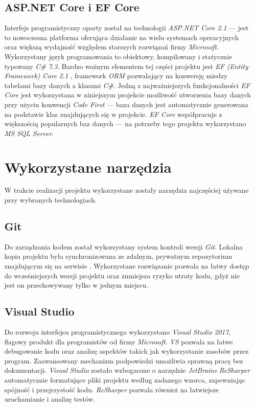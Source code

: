 \documentclass[eng,printmode,openany]{mgr}
\begin{document}
	\subsection{ASP.NET Core i EF Core}
	Interfejs programistyczny oparty został na technologii \textit{ASP.NET Core 2.1} — jest to nowoczesna platforma oferująca działanie na wielu systemach operacyjnych oraz większą wydajność względem starszych rozwiązań firmy \textit{Microsoft}. Wykorzystany język programowania to obiektowy, kompilowany i statycznie typowany \textit{C\# 7.3}. Bardzo ważnym elementem tej części projektu jest \textit{EF (Entity Framework) Core 2.1} \cite{msdn-efcore}, framework \textit{ORM}  pozwalający na konwersję miedzy tabelami bazy danych a klasami \textit{C\#}. Jedną z najważniejszych funkcjonalności \textit{EF Core} jest wykorzystana w niniejszym projekcie możliwość utworzenia bazy danych przy użyciu konwencji \textit{Code First} — baza danych jest automatycznie generowana na podstawie klas  znajdujących się w projekcie. \textit{EF Core} współpracuje z większością popularnych baz danych — na potrzeby tego projektu wykorzystano \textit{MS SQL Server}.
	
	\section{Wykorzystane narzędzia}
	W trakcie realizacji projektu wykorzystane zostały narzędzia najczęściej używane przy wybranych technologiach.
	\subsection{Git}
	Do zarządzania kodem został wykorzystany system kontroli wersji \textit{Git}. Lokalna kopia projektu była synchronizowana ze zdalnym, prywatnym repozytorium znajdującym się na serwisie . Wykorzystane rozwiązanie pozwala na łatwy dostęp do wcześniejszych wersji projektu oraz zmniejsza ryzyko utraty kodu, gdyż nie jest on przechowywany tylko w jednym miejscu.
	\subsection{Visual Studio}
	Do rozwoju interfejsu programistycznego wykorzystano \textit{Visual Studio 2017}, flagowy produkt dla programistów od firmy \textit{Microsoft}. \textit{VS} pozwala na łatwe debugowanie kodu oraz analizę aspektów takich jak wykorzystanie zasobów przez program. Zaawansowany mechanizm podpowiedzi umożliwia sprawną pracę bez dokumentacji. \textit{Visual Studio} zostało wzbogacone o narzędzie \textit{JetBrains ReSharper} automatycznie formatujące pliki projektu według zadanego wzorca, zapewniając spójność i przejrzystość kodu. \textit{ReSharper} pozwala również na łatwiejsze uruchamianie i analizę testów.
	
\end{document}
